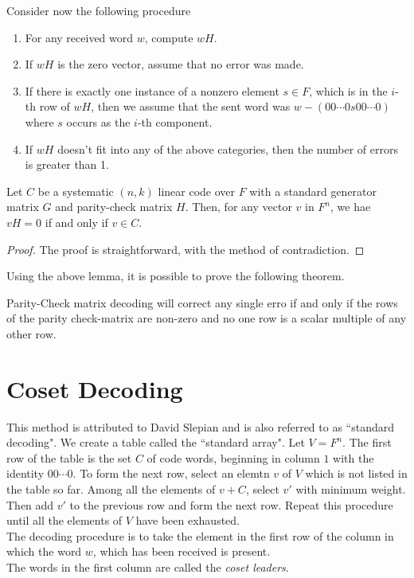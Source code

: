 Consider now the following procedure
\begin{enumerate}
	\item For any received word $w$, compute $wH$.
	\item If $wH$ is the zero vector, assume that no error was made.
	\item If there is exactly one instance of a nonzero element $s\in F$, which is in the $i$-th row of $wH$, then we assume that the sent word was $w - (00\cdots0s00\cdots0)$ where $s$ occurs as the $i$-th component.
	\item If $wH$ doesn't fit into any of the above categories, then the number of errors is greater than 1.
\end{enumerate}

\begin{lemma}
	Let $C$ be a systematic $(n,k)$ linear code over $F$ with a standard generator matrix $G$ and parity-check matrix $H$. Then, for any vector $v$ in $F^n$, we hae $vH = 0$ if and only if $v\in C$.
\end{lemma}
\begin{proof}
	The proof is straightforward, with the method of contradiction.
\end{proof}

Using the above lemma, it is possible to prove the following theorem.

\begin{theorem}
	Parity-Check matrix decoding will correct any single erro if and only if the rows of the parity check-matrix are non-zero and no one row is a scalar multiple of any other row.
\end{theorem}

\section*{Coset Decoding}
This method is attributed to David Slepian and is also referred to as ``standard decoding". We create a table called the ``standard array". Let $V = F^n$. The first row of the table is the set $C$ of code words, beginning in column $1$ with the identity $00\cdots0$. To form the next row, select an elemtn $v$ of $V$ which is not listed in the table so far. Among all the elements of $v+C$, select $v'$ with minimum weight. Then add $v'$ to the previous row and form the next row. Repeat this procedure until all the elements of $V$ have been exhausted.\\
The decoding procedure is to take the element in the first row of the column in which the word $w$, which has been received is present.\\
The words in the first column are called the \textit{coset leaders}.


